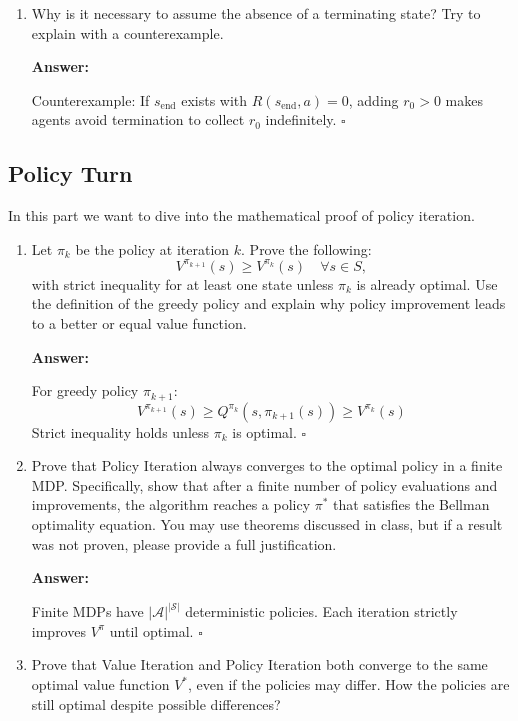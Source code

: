 \documentclass[12pt]{article}
\begin{document}
{{\begin{enumerate}[resume*]
    \item  
    Why is it necessary to assume the absence of a terminating state? Try to explain with a counterexample.  

    \textbf{Answer:}
    
    Counterexample: If \(s_{\text{end}}\) exists with \(R(s_{\text{end}},a) = 0\), adding \(r_0 > 0\) makes agents avoid termination to collect \(r_0\) indefinitely. \hfill \(\square\)


\end{enumerate}



\subsection{Policy Turn}
In this part we want to dive into the mathematical proof of policy iteration.
\begin{enumerate}[resume*]
\item Let \( \pi_k \) be the policy at iteration \( k \). Prove the following:
    \[
    V^{\pi_{k+1}}(s) \geq V^{\pi_k}(s) \quad \forall s \in S,
    \]
    with strict inequality for at least one state unless \( \pi_k \) is already optimal. Use the definition of the greedy policy and explain why policy improvement leads to a better or equal value function.

    \textbf{Answer:}
    
    For greedy policy \(\pi_{k+1}\):
    \[
    V^{\pi_{k+1}}(s) \geq Q^{\pi_k}(s,\pi_{k+1}(s)) \geq V^{\pi_k}(s)
    \]
    Strict inequality holds unless \(\pi_k\) is optimal. \hfill \(\square\)


    \item Prove that Policy Iteration always converges to the optimal policy in a finite MDP. Specifically, show that after a finite number of policy evaluations and improvements, the algorithm reaches a policy \( \pi^* \) that satisfies the Bellman optimality equation.  
    You may use theorems discussed in class, but if a result was not proven, please provide a full justification.

    \textbf{Answer:}
    
    Finite MDPs have \(|\mathcal{A}|^{|\mathcal{S}|}\) deterministic policies. Each iteration strictly improves \(V^\pi\) until optimal. \hfill \(\square\)

    
    
\item Prove that Value Iteration and Policy Iteration both converge to the same optimal value function \( V^* \), even if the policies may differ. How the policies are still optimal despite possible differences?


\end{enumerate}}}
\end{document}
